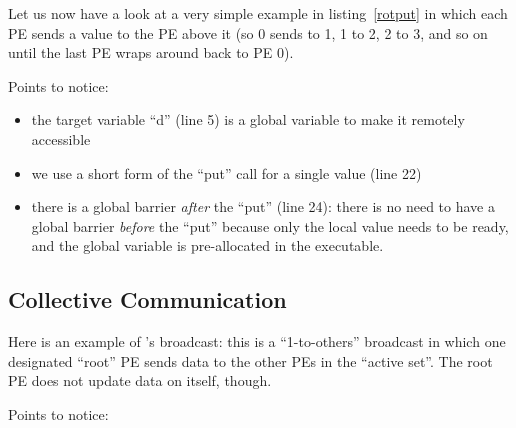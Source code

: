 Let us now have a look at a very simple \openshmem example in
listing~\ref{rotput} in which each PE sends a value to the PE above it
(so 0 sends to 1, 1 to 2, 2 to 3, and so on until the last PE wraps
around back to PE 0).

\begin{minipage}{\linewidth}
\vspace{0.1in}
\vspace{0.1in}
\end{minipage}

Points to notice:

\begin{itemize}
\item the target variable ``d'' (line 5) is a global variable to make
  it remotely accessible
\item we use a short form of the ``put'' call for a single value (line
  22)
\item there is a global barrier \emph{after} the ``put'' (line 24):
  there is no need to have a global barrier \emph{before} the ``put''
  because only the local value needs to be ready, and the global
  variable is pre-allocated in the executable.
\end{itemize}

\subsection{Collective Communication}

Here is an example of \openshmem's broadcast: this is a ``1-to-others''
broadcast in which one designated ``root'' PE sends data to the other
PEs in the ``active set''.  The root PE does not update data on
itself, though.

\begin{minipage}{\linewidth}
\vspace{0.1in}
\vspace{0.1in}
\end{minipage}

Points to notice:

